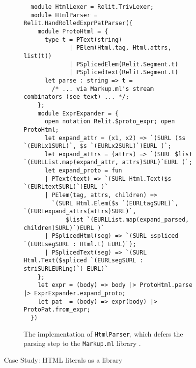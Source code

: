 \documentclass[acmsmall,screen]{acmart}
\newcommand{\li}[1]{\lstinline[basicstyle=\ttfamily\fontsize{9pt}{1em}\selectfont]{#1}}
\begin{document}
\begin{figure}[t]
\begin{subfigure}[t]{\textwidth}
\vspace{3px}
\begin{lstlisting}
  module HtmlLexer = Relit.TrivLexer;
  module HtmlParser = Relit.HandRolledExprPatParser({
    module ProtoHtml = {
      type t = PText(string)
             | PElem(Html.tag, Html.attrs, list(t))
             | PSplicedElem(Relit.Segment.t) 
             | PSplicedText(Relit.Segment.t) 
      let parse : string => t = 
        /* ... via Markup.ml's stream combinators (see text) ... */;
    };
    module ExprExpander = {
      open notation Relit.$proto_expr; open ProtoHtml;
      let expand_attr = (x1, x2) => `(SURL ($s `(EURLx1SURL)`, $s `(EURLx2SURL)`)EURL )`;
      let expand_attrs = (attrs) => `(SURL $list `(EURLList.map(expand_attr, attrs)SURL)`EURL )`;
      let expand_proto = fun 
      | PText(text) => `(SURL Html.Text($s `(EURLtextSURL)`)EURL )` 
      | PElem(tag, attrs, children) => 
        `(SURL Html.Elem($s `(EURLtagSURL)`, `(EURLexpand_attrs(attrs)SURL)`, 
            $list `(EURLList.map(expand_parsed, children)SURL)`)EURL )`
      | PSplicedHtml(seg) => `(SURL $spliced `(EURLsegSURL : Html.t) EURL)`);
      | PSplicedText(seg) => `(SURL Html.Text($spliced `(EURLsegSURL : striSURLEURLng)`) EURL)`
    };
    let expr = (body) => body |> ProtoHtml.parse |> ExprExpander.expand_proto;
    let pat  = (body) => expr(body) |> ProtoPat.from_expr;
  })
\end{lstlisting}
\vspace{-6px}
\caption{The implementation of \li{HtmlParser}, which defers the parsing step to the \li{Markup.ml} library \cite{markupml}.}
\label{fig:html-parser}
\vspace{-5px}
\end{subfigure}
\vspace{5px}
\caption{Case Study: HTML literals as a library}
\vspace{-4px}
\label{fig:html-case-study}
\end{figure}
\end{document}
